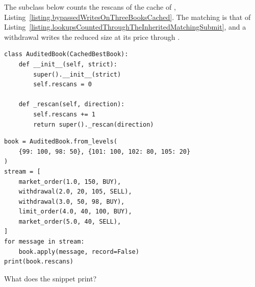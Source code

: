 \begin{question}
\label{question.rescansCountedThroughTheCache}
The subclass below counts the rescans of the cache of ,
Listing~\ref{listing.bypassedWritesOnThreeBooksCached}.
The matching is that of Listing~\ref{listing.lookupsCountedThroughTheInheritedMatchingSubmit},
and a withdrawal writes the reduced size at its price through .
\begin{lstlisting}[caption={A cached book that counts its rescans}, label=listing.rescansCountedThroughTheCacheClass]
class AuditedBook(CachedBestBook):
    def __init__(self, strict):
        super().__init__(strict)
        self.rescans = 0

    def _rescan(self, direction):
        self.rescans += 1
        return super()._rescan(direction)
\end{lstlisting}
\begin{lstlisting}[caption={Five messages}, label=listing.rescansCountedThroughTheCacheRun]
book = AuditedBook.from_levels(
    {99: 100, 98: 50}, {101: 100, 102: 80, 105: 20}
)
stream = [
    market_order(1.0, 150, BUY),
    withdrawal(2.0, 20, 105, SELL),
    withdrawal(3.0, 50, 98, BUY),
    limit_order(4.0, 40, 100, BUY),
    market_order(5.0, 40, SELL),
]
for message in stream:
    book.apply(message, record=False)
print(book.rescans)
\end{lstlisting}
What does the snippet print?
\begin{choices}
 \choice {}
 \correctchoice {}
 \choice {}
 \choice {}
 \choice {}
\end{choices}
\end{question}

